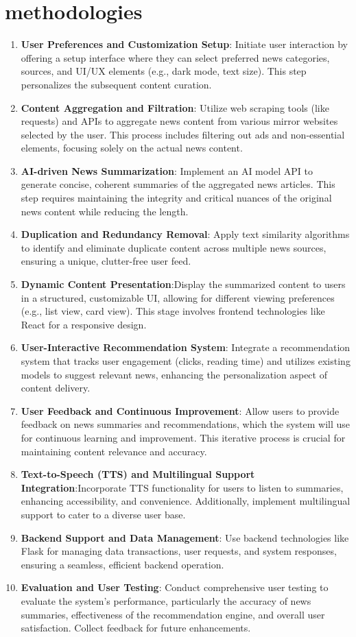 \documentclass[a4paper]{article}
\begin{document}
\section{methodologies}

\begin{enumerate}
    \item {\bf User Preferences and Customization Setup}: Initiate user interaction by offering a setup interface where they can select preferred news categories, sources, and UI/UX elements (e.g., dark mode, text size). This step personalizes the subsequent content curation.
    \item {\bf Content Aggregation and Filtration}: Utilize web scraping tools (like requests) and APIs to aggregate news content from various mirror websites selected by the user. This process includes filtering out ads and non-essential elements, focusing solely on the actual news content.
    \item {\bf AI-driven News Summarization}: Implement an AI model API to generate concise, coherent summaries of the aggregated news articles. This step requires maintaining the integrity and critical nuances of the original news content while reducing the length.
    \item {\bf Duplication and Redundancy Removal}: Apply text similarity algorithms to identify and eliminate duplicate content across multiple news sources, ensuring a unique, clutter-free user feed.
    \item {\bf Dynamic Content Presentation}:Display the summarized content to users in a structured, customizable UI, allowing for different viewing preferences (e.g., list view, card view). This stage involves frontend technologies like React for a responsive design.
    \item {\bf User-Interactive Recommendation System}: Integrate a recommendation system that tracks user engagement (clicks, reading time) and utilizes existing models to suggest relevant news, enhancing the personalization aspect of content delivery.
    \item {\bf User Feedback and Continuous Improvement}: Allow users to provide feedback on news summaries and recommendations, which the system will use for continuous learning and improvement. This iterative process is crucial for maintaining content relevance and accuracy.
    \item {\bf Text-to-Speech (TTS) and Multilingual Support Integration}:Incorporate TTS functionality for users to listen to summaries, enhancing accessibility, and convenience. Additionally, implement multilingual support to cater to a diverse user base.
    \item {\bf Backend Support and Data Management}: Use backend technologies like Flask for managing data transactions, user requests, and system responses, ensuring a seamless, efficient backend operation.
    \item {\bf Evaluation and User Testing}: Conduct comprehensive user testing to evaluate the system's performance, particularly the accuracy of news summaries, effectiveness of the recommendation engine, and overall user satisfaction. Collect feedback for future enhancements.
\end{enumerate}
\end{document}

